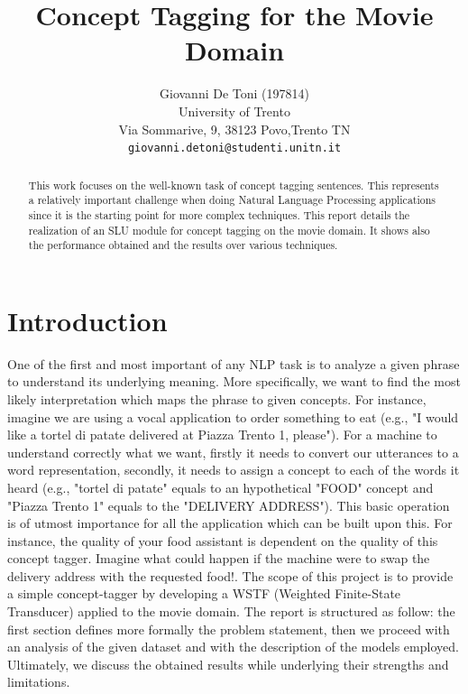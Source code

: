 \documentclass[11pt,a4paper]{article}
\title{Concept Tagging for the Movie Domain}
\author{Giovanni De Toni (197814) \\
  University of Trento \\ Via Sommarive, 9, 38123 Povo,Trento TN\\
  \texttt{giovanni.detoni@studenti.unitn.it}}
\date{}
\begin{document}
\maketitle

\begin{abstract}
This work focuses on the well-known task of concept tagging sentences. This represents a relatively important challenge when doing Natural Language Processing applications since it is the starting point for more complex techniques. This report details the realization of an SLU module for concept tagging on the movie domain. It shows also the performance obtained and the results over various techniques.
\end{abstract}

\section{Introduction}
One of the first and most important of any NLP task is to analyze a given phrase to understand its underlying meaning. More specifically, we want to find the most likely interpretation which maps the phrase to given concepts. For instance, imagine we are using a vocal application to order something to eat (e.g., "I would like a tortel di patate delivered at Piazza Trento 1, please"). For a machine to understand correctly what we want, firstly it needs to convert our utterances to a word representation, secondly, it needs to assign a concept to each of the words it heard (e.g., "tortel di patate" equals to an hypothetical "FOOD" concept and "Piazza Trento 1" equals to the "DELIVERY ADDRESS").
This basic operation is of utmost importance for all the application which can be built upon this. For instance, the quality of your food assistant is dependent on the quality of this concept tagger. Imagine what could happen if the machine were to swap the delivery address with the requested food!.  
The scope of this project is to provide a simple concept-tagger by developing a WSTF (Weighted Finite-State Transducer) applied to the movie domain.
The report is structured as follow: the first section defines more formally the problem statement, then we proceed with an analysis of the given dataset and with the description of the models employed. Ultimately, we discuss the obtained results while underlying their strengths and limitations.
 
\end{document}
